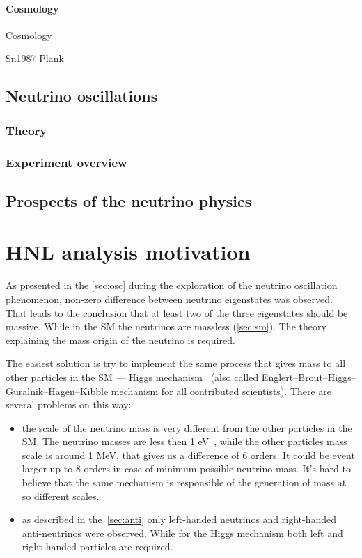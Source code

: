 \documentclass[../main.tex]{subfiles}
\begin{document}
\subsubsection{Cosmology}
Cosmology

Sn1987
Plank


\section{Neutrino oscillations}
\label{sec:osc}

\subsection{Theory}

\subsection{Experiment overview}
\label{sec:exp}



\section{Prospects of the neutrino physics}





\chapter{HNL analysis motivation}
\label{ch:intro:HNL}

As presented in the \autoref{sec:osc} during the exploration of the neutrino oscillation phenomenon, non-zero difference between neutrino eigenstates was observed. That leads to the conclusion that at least two of the three eigenstates should be massive. While in the SM the neutrinos are massless (\autoref{sec:sm}). The theory explaining the mass origin of the neutrino is required.

The easiest solution is try to implement the same process that gives mass to all other particles in the SM --- Higgs mechanism~\cite{Higgs1964} (also called Englert–Brout–Higgs–Guralnik–Hagen–Kibble mechanism for all contributed scientists). There are several problems on this way:
\begin{itemize}
  \item the scale of the neutrino mass is very different from the other particles in the SM. The neutrino masses are less then 1 eV~\cite{Aker2019}, while the other particles mass scale is around 1 MeV, that gives us a difference of 6 orders. It could be event larger up to 8 orders in case of minimum possible neutrino mass. It's hard to believe that the same mechanism is responsible of the generation of mass at so different scales.
  \item as described in the~\autoref{sec:anti} only left-handed neutrinos and right-handed anti-neutrinos were observed. While for the Higgs mechanism both left and right handed particles are required.
\end{itemize}
\end{document}
